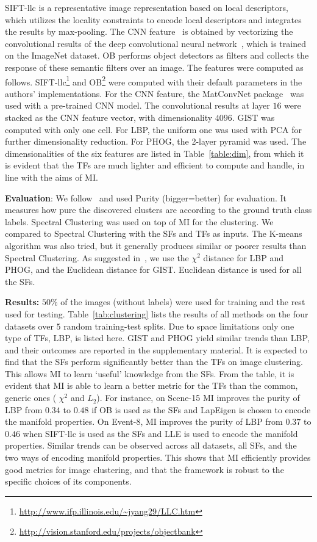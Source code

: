 \documentclass[10pt,twocolumn,letterpaper]{article}
\begin{document}
SIFT-llc is a representative image representation based on local
descriptors, which utilizes the locality constraints to encode local
descriptors and integrates the results by max-pooling.  The CNN
feature~\cite{deep:bmvc14} is obtained by vectorizing the
convolutional results of the deep convolutional neural
network~\cite{deepnet:nips12}, which is trained on the ImageNet
dataset. OB performs object detectors as filters and collects the
response of these semantic filters over an image. The features were
computed as follows.
SIFT-llc\footnote{\url{http://www.ifp.illinois.edu/~jyang29/LLC.htm}}
and OB\footnote{\url{http://vision.stanford.edu/projects/objectbank}}
were computed with their default parameters in the authors'
implementations. For the CNN feature, the MatConvNet
package~\cite{MatConvNet} was used with a pre-trained
CNN model. The convolutional results at layer $16$ were stacked as the CNN
feature vector, with dimensionality $4096$.  GIST was computed with
only one cell. For LBP, the uniform one was used with PCA for further
dimensionality reduction. For PHOG, the 2-layer pyramid was used. The
dimensionalities of the six features are listed in Table~\ref{table:dim},
from which it is evident that the TFs are much lighter and efficient
to compute and handle, in line with the aims of MI.

\textbf{Evaluation}: We follow~\cite{comp:ijcv09, dai:ensemble:eccv12}
and used Purity (bigger=better) for evaluation.  It measures how pure
the discovered clusters are according to the ground truth class
labels. Spectral Clustering was used on top of MI for the
clustering. We compared to Spectral Clustering with the SFs and TFs as
inputs. The K-means algorithm was also tried, but it generally
produces similar or poorer results than Spectral Clustering.  As
suggested in~\cite{dai:ensemble:eccv12}, we use the $\chi^2$ distance
for LBP and PHOG, and the Euclidean distance for GIST. Euclidean
distance is used for all the SFs.

\textbf{Results:} $50\%$ of the images (without labels) were used for
training and the rest used for testing. Table~\ref{tab:clustering}
lists the results of all methods on the four datasets over $5$ random
training-test splits. Due to space limitations only one type of TFs,
LBP, is listed here. GIST and PHOG yield similar trends than LBP, and
their outcomes are reported in the supplementary material. It is
expected to find that the SFs perform significantly better than the
TFs on image clustering. This allows MI to learn `useful' knowledge
from the SFs.  From the table, it is evident that MI is able to learn
a better metric for the TFs than the common, generic ones (\eg
$\chi^2$ and $L_2$). For instance, on Scene-15 MI improves the purity of
LBP from $0.34$ to $0.48$ if OB is used as the SFs and LapEigen is
chosen to encode the manifold properties. On Event-8, MI improves the
purity of LBP from $0.37$ to $0.46$ when SIFT-llc is used as the SFs
and LLE is used to encode the manifold properties. Similar trends can
be observed across all datasets, all SFs, and the two ways of encoding
manifold properties. This shows that MI efficiently provides good
metrics for image clustering, and that the framework is robust to the
specific choices of its components.
 
\end{document}
